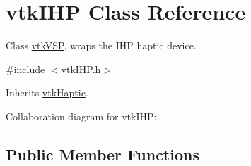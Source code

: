 \hypertarget{classvtkIHP}{
\section{vtkIHP Class Reference}
\label{classvtkIHP}
}


Class \hyperlink{classvtkVSP}{vtkVSP}, wraps the IHP haptic device.  




{\ttfamily \#include $<$vtkIHP.h$>$}



Inherits \hyperlink{classvtkHaptic}{vtkHaptic}.



Collaboration diagram for vtkIHP:\subsection*{Public Member Functions}
